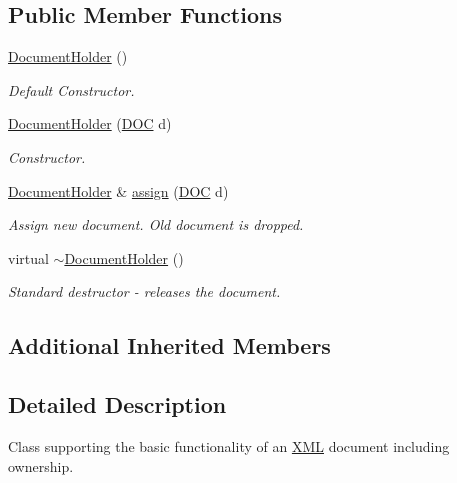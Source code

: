 \subsection*{Public Member Functions}
\begin{DoxyCompactItemize}
\item 
\hyperlink{class_d_d4hep_1_1_x_m_l_1_1_document_holder_abeb4692ba8b187e1b65921f3f53a0b64}{Document\+Holder} ()
\begin{DoxyCompactList}\small\item\em Default Constructor. \end{DoxyCompactList}\item 
\hyperlink{class_d_d4hep_1_1_x_m_l_1_1_document_holder_a8b64dfa073e0343d39b882cb24ce3ffa}{Document\+Holder} (\hyperlink{class_d_d4hep_1_1_x_m_l_1_1_document_a685ff83de83e9b7b37e79ad846fc2387}{D\+OC} d)
\begin{DoxyCompactList}\small\item\em Constructor. \end{DoxyCompactList}\item 
\hyperlink{class_d_d4hep_1_1_x_m_l_1_1_document_holder}{Document\+Holder} \& \hyperlink{class_d_d4hep_1_1_x_m_l_1_1_document_holder_ab71ec2747100221649d868aece161d1e}{assign} (\hyperlink{class_d_d4hep_1_1_x_m_l_1_1_document_a685ff83de83e9b7b37e79ad846fc2387}{D\+OC} d)
\begin{DoxyCompactList}\small\item\em Assign new document. Old document is dropped. \end{DoxyCompactList}\item 
virtual \hyperlink{class_d_d4hep_1_1_x_m_l_1_1_document_holder_a3620e4a3c05901eaefe31ea2e7fff5f5}{$\sim$\+Document\+Holder} ()
\begin{DoxyCompactList}\small\item\em Standard destructor -\/ releases the document. \end{DoxyCompactList}\end{DoxyCompactItemize}
\subsection*{Additional Inherited Members}


\subsection{Detailed Description}
Class supporting the basic functionality of an \hyperlink{namespace_d_d4hep_1_1_x_m_l}{X\+ML} document including ownership. 

